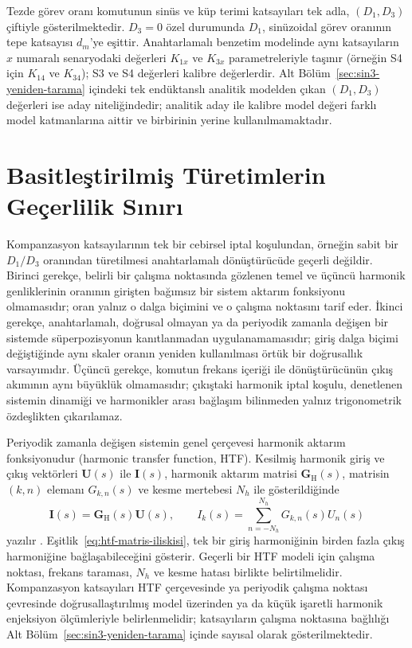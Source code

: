 Tezde görev oranı komutunun sinüs ve küp terimi katsayıları tek adla, $(D_1,D_3)$ çiftiyle gösterilmektedir. $D_3=0$ özel durumunda $D_1$, sinüzoidal görev oranının tepe katsayısı $d_m$'ye eşittir. Anahtarlamalı benzetim modelinde aynı katsayıların $x$ numaralı senaryodaki değerleri $K_{1x}$ ve $K_{3x}$ parametreleriyle taşınır (örneğin S4 için $K_{14}$ ve $K_{34}$); S3 ve S4 değerleri kalibre değerlerdir. Alt Bölüm~\ref{sec:sin3-yeniden-tarama} içindeki tek endüktanslı analitik modelden çıkan $(D_1,D_3)$ değerleri ise aday niteliğindedir; analitik aday ile kalibre model değeri farklı model katmanlarına aittir ve birbirinin yerine kullanılmamaktadır.

\section{Basitleştirilmiş Türetimlerin Geçerlilik Sınırı}

Kompanzasyon katsayılarının tek bir cebirsel iptal koşulundan, örneğin sabit bir $D_1/D_3$ oranından türetilmesi anahtarlamalı dönüştürücüde geçerli değildir. Birinci gerekçe, belirli bir çalışma noktasında gözlenen temel ve üçüncü harmonik genliklerinin oranının girişten bağımsız bir sistem aktarım fonksiyonu olmamasıdır; oran yalnız o dalga biçimini ve o çalışma noktasını tarif eder. İkinci gerekçe, anahtarlamalı, doğrusal olmayan ya da periyodik zamanla değişen bir sistemde süperpozisyonun kanıtlanmadan uygulanamamasıdır; giriş dalga biçimi değiştiğinde aynı skaler oranın yeniden kullanılması örtük bir doğrusallık varsayımıdır. Üçüncü gerekçe, komutun frekans içeriği ile dönüştürücünün çıkış akımının aynı büyüklük olmamasıdır; çıkıştaki harmonik iptal koşulu, denetlenen sistemin dinamiği ve harmonikler arası bağlaşım bilinmeden yalnız trigonometrik özdeşlikten çıkarılamaz.

Periyodik zamanla değişen sistemin genel çerçevesi harmonik aktarım fonksiyonudur (harmonic transfer function, HTF). Kesilmiş harmonik giriş ve çıkış vektörleri $\mathbf{U}(s)$ ile $\mathbf{I}(s)$, harmonik aktarım matrisi $\mathbf{G}_{\mathrm{H}}(s)$, matrisin $(k,n)$ elemanı $G_{k,n}(s)$ ve kesme mertebesi $N_h$ ile gösterildiğinde
\begin{equation}
  \mathbf{I}(s)=\mathbf{G}_{\mathrm{H}}(s)\mathbf{U}(s),
  \qquad
  I_k(s)=\sum_{n=-N_h}^{N_h}G_{k,n}(s)U_n(s)
  \label{eq:htf-matris-iliskisi}
\end{equation}
yazılır \citep{Wereley1991,Liao2022}. Eşitlik~\eqref{eq:htf-matris-iliskisi}, tek bir giriş harmoniğinin birden fazla çıkış harmoniğine bağlaşabileceğini gösterir. Geçerli bir HTF modeli için çalışma noktası, frekans taraması, $N_h$ ve kesme hatası birlikte belirtilmelidir. Kompanzasyon katsayıları HTF çerçevesinde ya periyodik çalışma noktası çevresinde doğrusallaştırılmış model üzerinden ya da küçük işaretli harmonik enjeksiyon ölçümleriyle belirlenmelidir; katsayıların çalışma noktasına bağlılığı Alt Bölüm~\ref{sec:sin3-yeniden-tarama} içinde sayısal olarak gösterilmektedir.

